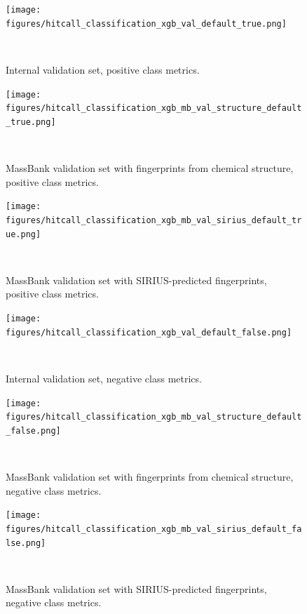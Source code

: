 \begin{figure}
  \centering
  \texttt{[image: figures/hitcall\_classification\_xgb\_val\_default\_true.png]}
  \caption{Internal validation set, positive class metrics.}
~\label{fig:hitcall_classification_xgb_val_default_true}
\end{figure}

\begin{figure}
  \centering
  \texttt{[image: figures/hitcall\_classification\_xgb\_mb\_val\_structure\_default\_true.png]}
  \caption{MassBank validation set with fingerprints from chemical structure, positive class metrics.}
~\label{fig:hitcall_classification_xgb_mb_val_structure_default_true}
\end{figure}

\begin{figure}
  \centering
  \texttt{[image: figures/hitcall\_classification\_xgb\_mb\_val\_sirius\_default\_true.png]}
  \caption{MassBank validation set with SIRIUS-predicted fingerprints, positive class metrics.}
~\label{fig:hitcall_classification_xgb_mb_val_sirius_default_true}
\end{figure}


\begin{figure}
  \centering
  \texttt{[image: figures/hitcall\_classification\_xgb\_val\_default\_false.png]}
  \caption{Internal validation set, negative class metrics.}
~\label{fig:hitcall_classification_xgb_val_default_false}
\end{figure}

\begin{figure}
  \centering
  \texttt{[image: figures/hitcall\_classification\_xgb\_mb\_val\_structure\_default\_false.png]}
  \caption{MassBank validation set with fingerprints from chemical structure, negative class metrics.}
~\label{fig:hitcall_classification_xgb_mb_val_structure_default_false}
\end{figure}

\begin{figure}
  \centering
  \texttt{[image: figures/hitcall\_classification\_xgb\_mb\_val\_sirius\_default\_false.png]}
  \caption{MassBank validation set with SIRIUS-predicted fingerprints, negative class metrics.}
~\label{fig:hitcall_classification_xgb_mb_val_sirius_default_false}
\end{figure}



\newpage

